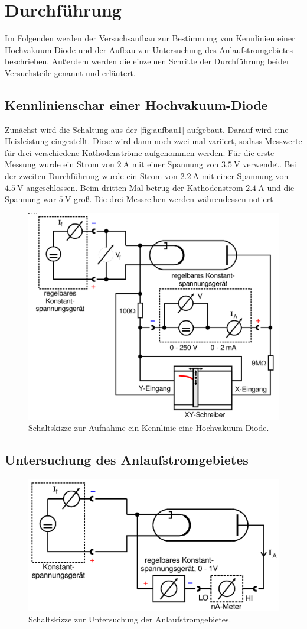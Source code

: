 \section{Durchführung}
\label{sec:durchführung}

Im Folgenden werden der Versuchsaufbau zur Bestimmung von Kennlinien einer Hochvakuum-Diode und der Aufbau zur Untersuchung 
des Anlaufstromgebietes beschrieben. Außerdem werden die einzelnen Schritte der Durchführung beider Versuchsteile genannt und erläutert.

\subsection{Kennlinienschar einer Hochvakuum-Diode}
\label{sec:Kennlinieschar}
 
Zunächst wird die Schaltung aus der \autoref{fig:aufbau1} aufgebaut. Darauf wird eine Heizleistung eingestellt.
Diese wird dann noch zwei mal variiert, sodass Messwerte für drei verschiedene Kathodenströme aufgenommen werden.
Für die erste Messung wurde ein Strom von $\SI{2}{\ampere}$ mit einer Spannung von $\SI{3.5}{\volt}$ verwendet.
Bei der zweiten Durchführung wurde ein Strom von $\SI{2.2}{\ampere}$ mit einer Spannung von $\SI{4.5}{\volt}$ angeschlossen.
Beim dritten Mal betrug der Kathodenstrom $\SI{2.4}{\ampere}$ und die Spannung war $\SI{5}{\volt}$ groß.
Die drei Messreihen werden währendessen notiert

\begin{figure}[H]
    \centering
    \includegraphics[width=0.5\linewidth]{content/grafik/aufbau1.png}
    \caption{Schaltskizze zur Aufnahme ein Kennlinie eine Hochvakuum-Diode.\cite{elektron}}
    \label{fig:aufbau1}
\end{figure}

\subsection{Untersuchung des Anlaufstromgebietes}
\label{sec:Untersuchung des Anlaufstromgebietes}



\begin{figure}[H]
    \centering
    \includegraphics[width=0.5\linewidth]{content/grafik/aufbau2.png}
    \caption{Schaltskizze zur Untersuchung der Anlaufstromgebietes.\cite{elektron}}
    \label{fig:aufbau2}
\end{figure}